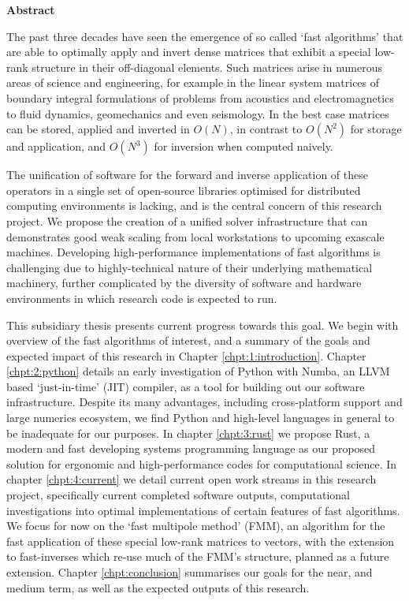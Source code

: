 \thispagestyle{plain}

\begin{center}
    \textbf{Abstract}
\end{center}

The past three decades have seen the emergence of so called `fast algorithms' that are able to optimally apply and invert dense matrices that exhibit a special low-rank structure in their off-diagonal elements. Such matrices arise in numerous areas of science and engineering, for example in the linear system matrices of boundary integral formulations of problems from acoustics and electromagnetics to fluid dynamics, geomechanics and even seismology. In the best case matrices can be stored, applied and inverted in $O(N)$, in contrast to $O(N^2)$ for storage and application, and $O(N^3)$ for inversion when computed naively. 

The unification of software for the forward and inverse application of these operators in a single set of open-source libraries optimised for distributed computing environments is lacking, and is the central concern of this research project. We propose the creation of a unified solver infrastructure that can demonstrates good weak scaling from local workstations to upcoming exascale machines. Developing high-performance implementations of fast algorithms is challenging due to highly-technical nature of their underlying mathematical machinery, further complicated by the diversity of software and hardware environments in which research code is expected to run.

This subsidiary thesis presents current progress towards this goal. We begin with overview of the fast algorithms of interest, and a summary of the goals and expected impact of this research in Chapter \ref{chpt:1:introduction}. Chapter \ref{chpt:2:python} details an early investigation of Python with Numba, an LLVM based `just-in-time' (JIT) compiler, as a tool for building out our software infrastructure. Despite its many advantages, including cross-platform support and large numerics ecosystem, we find Python and high-level languages in general to be inadequate for our purposes. In chapter \ref{chpt:3:rust} we propose Rust, a modern and fast developing systems programming language as our proposed solution for ergonomic and high-performance codes for computational science. In chapter \ref{chpt:4:current} we detail current open work streams in this research project, specifically current completed software outputs, computational investigations into optimal implementations of certain features of fast algorithms. We focus for now on the `fast multipole method' (FMM), an algorithm for the fast application of these special low-rank matrices to vectors, with the extension to fast-inverses which re-use much of the FMM's structure, planned as a future extension. Chapter \ref{chpt:conclusion} summarises our goals for the near, and medium term, as well as the expected outputs of this research.

